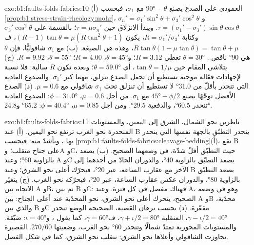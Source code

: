 \begin{solution}{exo:b1:faults-folds-fabrics:10}
(أ) العمودي على الصدع يصنع $\ang{90} - \theta$ مع $\sigma_1$، فبحسب \cref{prop:b1:stress-strain-rheology:mohr}،
$\sigma_n' = \sigma_1'\sin^2\theta + \sigma_3'\cos^2\theta$ و
$\tau = (\sigma_1' - \sigma_3')\sin\theta\cos\theta$. ويبدأ الانزلاق حين
$\tau = \mu\sigma_n'$؛ بالقسمة على $\sigma_3'\cos^2\theta$ وكتابة
$R = \sigma_1'/\sigma_3'$، يكون $(R - 1)\tan\theta = \mu(R\tan^2\theta + 1)$، ف
$R\tan\theta(1 - \mu\tan\theta) = \tan\theta + \mu$، وهذه هي الصيغة.
(ب) مع $\sigma_1$ شاقوليًّا، فإن $\theta$ هي \ang{90} ناقص :
$\theta = \ang{30}$ تعطي $R = 3.12$؛ و$\theta = \ang{45}$، $R = 4.00$؛
$\theta = \ang{55}$، $R = 9.92$. (ج) يتلاشى المقام حين
$\tan\theta = 1/\mu$، أي $\theta = \ang{59.0}$؛ وبعده تكون $R$ سالبة:
فلا نسبة لإجهادات فعّالة موجبة تستطيع أن تجعل الصدع ينزلق، مهما كبر
$\sigma_1'$. والصدوع العادية التي تنحدر بأقلّ من \ang{31.0} لا تستطيع أن تنزلق
تحت $\sigma_1$ شاقولي مع $\mu = 0.6$. (د) الصدع الأفضل توجّهًا يصنع
$\ang{45} - \phi/2$ مع $\sigma_1$. من أجل $\mu = 0.6$، $\phi = \ang{31.0}$:
الصدوع العادية تنحدر \ang{60.5}، والدفعية \ang{29.5}. ومن أجل $\mu = 0.85$،
$\phi = \ang{40.4}$: \ang{65.2} و\ang{24.8}.
\end{solution}

\begin{solution}{exo:b1:faults-folds-fabrics:11}
ناظرين نحو الشمال، الشرق إلى اليمين، والمستويات المنحدرة نحو الغرب ترتفع نحو اليمين. (أ) عند B ينحدر التطبّق بالجهة نفسها التي ينحدر بها ، وبأشدّ منه: فبحسب \cref{prop:b1:faults-folds-fabrics:cleavage-bedding}(أ)، تقع B على جناح منقلب؛ وA وC، حيث التطبّق أقلّ شدّة، في وضعهما الصحيح. (ب) يصعد  بالزاوية \ang{60}؛ وعند A وC يصعد التطبّق بالزاوية \ang{40}، والدوران الحادّ من أحدهما إلى الآخر مع عقارب الساعة، عبر \ang{20}، فيحرّك أعلى  نحو الشرق؛ وعند B يصعد التطبّق بالزاوية \ang{80}، والدوران عكس عقارب الساعة، عبر \ang{20}، فيحرّكه نحو الغرب. (ج) يتغيّر الاتجاه بين A وB، ثم بين B وC: فهناك مفصل في كل فترة. وعند A، وهو في وضعه الصحيح، يتحرك أعلى  نحو الشرق، نحو  المحدّبة عند أعلى الجناح:  بين A وB  محدّبة، والذي بين B وC  مقعّرة. (د) بحسب برهان القضية،  الصحيحة الوضع تنحدر $\gamma - \iota/2 = \ang{40}$،  المنقلبة $\gamma + \iota/2 =
\ang{80}$، ف$\gamma = \ang{60}$، كما يقول ، و$\iota =
\ang{40}$:  ضيّقة. والمستويات المحورية تمتدّ شمالًا وتنحدر \ang{60} نحو الغرب، وضعيتها $270/60$.  القصيرة تجاوزت الشاقولي وأعلاها نحو الشرق:  تنقلب نحو الشرق، كما في شكل الفصل.
\end{solution}

